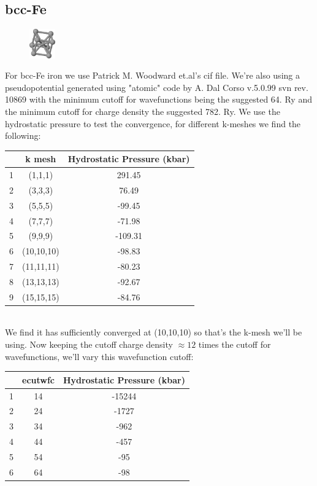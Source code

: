 \documentclass[twoside,twocolumn,11pt]{article} %
\begin{document}
\subsection{bcc-Fe}
\begin{figure}
  \begin{center}
	  \includegraphics[width=0.1\textwidth]{figures/bcc-iron.png}
  \end{center}
\end{figure}
For bcc-Fe iron we use Patrick M. Woodward et.al's cif file. We're also using a pseudopotential generated using "atomic" code by A.
Dal Corso  v.5.0.99 svn rev. 10869 with the minimum cutoff for wavefunctions
being the suggested 64. Ry and the minimum cutoff for charge density the
suggested 782. Ry. We use the hydrostatic pressure to test the convergence, for different k-meshes we find the following:
\begin{table}[ht]
\begin{tabular}{c|c|c}
	& k mesh & Hydrostatic Pressure (kbar)\\
	\hline
	1&(1,1,1)&291.45\\
	2&(3,3,3)&76.49\\
	3&(5,5,5)&-99.45\\
	4&(7,7,7)&-71.98\\
	5&(9,9,9)&-109.31\\
	6&(10,10,10)&-98.83\\
	7&(11,11,11)&-80.23\\
	8&(13,13,13)&-92.67\\
	9&(15,15,15)&-84.76\\
\end{tabular}
\end{table}\\
We find it has sufficiently converged at (10,10,10) so that's the k-mesh we'll
be using. Now keeping the cutoff charge density $\approx 12$ times the cutoff
for wavefunctions, we'll vary this wavefunction cutoff: \begin{table}[ht]
\begin{tabular}{c|c|c}
	&ecutwfc&Hydrostatic Pressure (kbar)\\
	\hline
	1&14&-15244\\
	2&24&-1727\\
	3&34&-962\\
	4&44&-457\\
	5&54&-95\\
	6&64&-98\\
\end{tabular}
\end{table}\\
\end{document}
